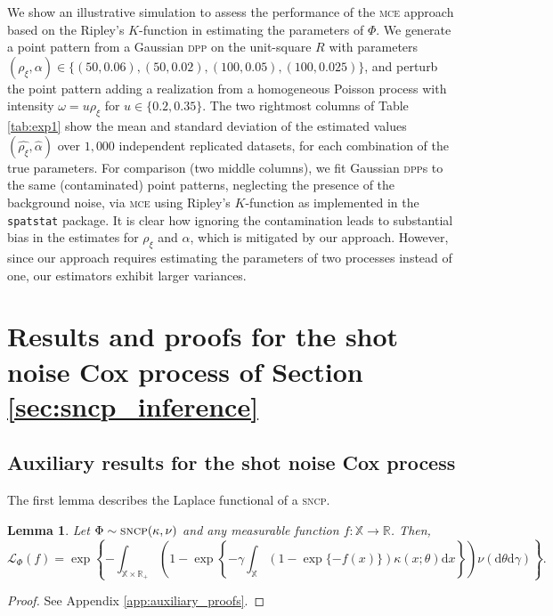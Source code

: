 \documentclass[11pt,a4paper,oneside]{article}
\newcommand{\dd}{\mathrm d}
\newcommand{\X}{\mathbb{X}}
\newcommand{\R}{\mathbb{R}}
\newtheorem{lemma}{Lemma}
\theoremstyle{definition}
\theoremstyle{remark}
\begin{document}
We show an illustrative simulation to assess the performance of the \textsc{mce} approach based on the Ripley's $K$-function in estimating the parameters of $\Phi$. %
We generate a point pattern from a Gaussian \textsc{dpp} on the unit-square $R$ with parameters $(\rho_\xi, \alpha) \in \{(50, 0.06), (50, 0.02), (100, 0.05), (100, 0.025)\}$, and perturb the point pattern adding a realization from a homogeneous Poisson process with intensity $\omega = u \rho_\xi$ for $u \in \{0.2, 0.35\}$. 
The two rightmost columns of Table \ref{tab:exp1} show the mean and standard deviation of the estimated values $(\hat{\rho_\xi}, \hat{\alpha})$ over $1,000$ independent replicated datasets, for each combination of the true parameters. 
For comparison (two middle columns), we fit Gaussian \textsc{dpp}s to the same (contaminated) point patterns, neglecting the presence of the background noise, via \textsc{mce} using Ripley's $K$-function as implemented in the \texttt{spatstat} package.
It is clear how ignoring the contamination leads to substantial bias in the estimates for $\rho_\xi$ and $\alpha$, which is mitigated by our approach. However, since our approach requires estimating the parameters of two processes instead of one, our estimators exhibit larger variances.


\section{Results and proofs for the shot noise Cox process of Section \ref{sec:sncp_inference}}

\subsection{Auxiliary results for the shot noise Cox process}\label{app:auxiliary_results}

The first lemma describes the Laplace functional of a \textsc{sncp}.

\begin{lemma}\label{lemma:laplace_sncp}
Let $\Phi \sim \textsc{sncp}(\kappa, \nu)$ and any measurable function $f: \X \to \R$. Then,
\[
\mathcal{L}_{\Phi}(f) = \exp\left\{ - \int_{\X\times\R_+} \left( 1- \exp\left\{ 
-\gamma \int_{\X} (1 - \exp\{-f(x)\} ) \kappa(x; \theta) \dd x \right\} \right) \nu(\dd \theta \dd \gamma) \right\}.
\]
\end{lemma}
\begin{proof}
    See Appendix \ref{app:auxiliary_proofs}.
\end{proof}
\end{document}
